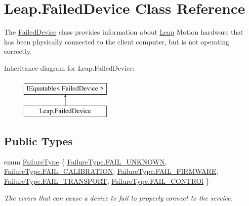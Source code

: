\hypertarget{class_leap_1_1_failed_device}{}\section{Leap.\+Failed\+Device Class Reference}
\label{class_leap_1_1_failed_device}


The \mbox{\hyperlink{class_leap_1_1_failed_device}{Failed\+Device}} class provides information about \mbox{\hyperlink{namespace_leap}{Leap}} Motion hardware that has been physically connected to the client computer, but is not operating correctly.  


Inheritance diagram for Leap.\+Failed\+Device\+:\begin{figure}[H]
\begin{center}
\leavevmode
\includegraphics[height=2.000000cm]{class_leap_1_1_failed_device}
\end{center}
\end{figure}
\subsection*{Public Types}
\begin{DoxyCompactItemize}
\item 
enum \mbox{\hyperlink{class_leap_1_1_failed_device_a2737c8ecbc644f3d14200183fe08c3a9}{Failure\+Type}} \{ \newline
\mbox{\hyperlink{class_leap_1_1_failed_device_a2737c8ecbc644f3d14200183fe08c3a9aeda4e06c6e1b0801cab868f56bc87b97}{Failure\+Type.\+F\+A\+I\+L\+\_\+\+U\+N\+K\+N\+O\+WN}}, 
\mbox{\hyperlink{class_leap_1_1_failed_device_a2737c8ecbc644f3d14200183fe08c3a9ad6a30cc533d141ed8ffb144bb01e678f}{Failure\+Type.\+F\+A\+I\+L\+\_\+\+C\+A\+L\+I\+B\+R\+A\+T\+I\+ON}}, 
\mbox{\hyperlink{class_leap_1_1_failed_device_a2737c8ecbc644f3d14200183fe08c3a9a4e855910f0850ae585ddddf579f49f3a}{Failure\+Type.\+F\+A\+I\+L\+\_\+\+F\+I\+R\+M\+W\+A\+RE}}, 
\mbox{\hyperlink{class_leap_1_1_failed_device_a2737c8ecbc644f3d14200183fe08c3a9aa74ff1f49e32caeca0b82394362549da}{Failure\+Type.\+F\+A\+I\+L\+\_\+\+T\+R\+A\+N\+S\+P\+O\+RT}}, 
\newline
\mbox{\hyperlink{class_leap_1_1_failed_device_a2737c8ecbc644f3d14200183fe08c3a9a61d3250c273ea4eeb59cc5c3529d3c2d}{Failure\+Type.\+F\+A\+I\+L\+\_\+\+C\+O\+N\+T\+R\+Ol}}
 \}
\begin{DoxyCompactList}\small\item\em The errors that can cause a device to fail to properly connect to the service. \end{DoxyCompactList}\end{DoxyCompactItemize}
